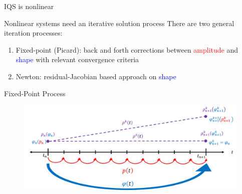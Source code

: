 \documentclass[8pt,xcolor=dvipnames]{beamer}
\newcommand{\tcr}[1]{\textcolor{red}{#1}}
\newcommand{\tcb}[1]{\textcolor{blue}{#1}}
\begin{document}
\begin{frame}{IQS is nonlinear}

\begin{block}{Nonlinear systems need an iterative solution process}
There are two general iteration processes: 
\begin{enumerate}
\item Fixed-point (Picard): back and forth corrections between \tcr{amplitude} and \tcb{shape} with relevant convergence criteria
\item Newton: residual-Jacobian based approach on \tcb{shape}
\end{enumerate}
\end{block}

\begin{block}{Fixed-Point Process}
\begin{figure}
\includegraphics[width=\linewidth]{figures/iqs_iter_proc.png}
\end{figure}
\end{block}

\end{frame}
\end{document}
